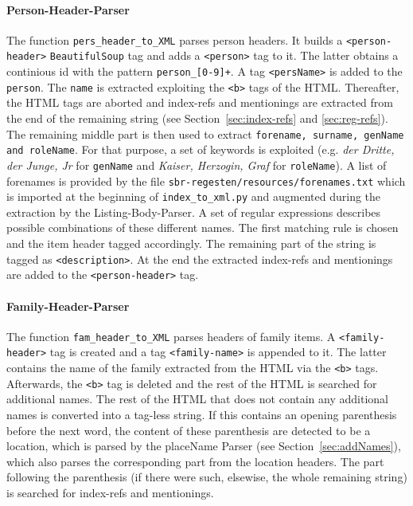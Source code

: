 \paragraph{Person-Header-Parser}
The function \texttt{pers\_header\_to\_XML} parses person headers. It
builds a \texttt{<person-header>} \texttt{BeautifulSoup} tag and adds
a \texttt{<person>} tag to it. The latter obtains a continious id with
the pattern \texttt{person\_[0-9]+}. A tag \texttt{<persName>} is
added to the \texttt{person}. The \texttt{name} is extracted
exploiting the \texttt{<b>} tags of the HTML. Thereafter, the HTML
tags are aborted and index-refs and mentionings are extracted from the
end of the remaining string (see Section~\ref{sec:index-refs} and
\ref{sec:reg-refs}). The remaining middle part is then used to extract
\texttt{forename, surname, genName and roleName}. For that purpose, a
set of keywords is exploited (e.g. \textit{der Dritte, der Junge, Jr}
for \texttt{genName} and \textit{Kaiser, Herzogin, Graf} for
\texttt{roleName}). A list of forenames is provided by the file
\texttt{sbr-regesten/resources/forenames.txt} which is imported at the
beginning of \texttt{index\_to\_xml.py} and augmented during the
extraction by the Listing-Body-Parser. A set of regular expressions
describes possible combinations of these different names. The first
matching rule is chosen and the item header tagged accordingly. The
remaining part of the string is tagged as \texttt{<description>}. At
the end the extracted index-refs and mentionings are added to the
\texttt{<person-header>} tag.

\paragraph{Family-Header-Parser}
The function \texttt{fam\_header\_to\_XML} parses headers of family
items. A \texttt{<family-header>} tag is created and a tag
\texttt{<family-name>} is appended to it. The latter contains the name
of the family extracted from the HTML via the \texttt{<b>} tags.
Afterwards, the \texttt{<b>} tag is deleted and the rest of the HTML
is searched for additional names. The rest of the HTML that does not
contain any additional names is converted into a tag-less string. If
this contains an opening parenthesis before the next word, the content
of these parenthesis are detected to be a location, which is parsed by
the placeName Parser (see Section~\ref{sec:addNames}), which also
parses the corresponding part from the location headers. The part
following the parenthesis (if there were such, elsewise, the whole
remaining string) is searched for index-refs and mentionings.

